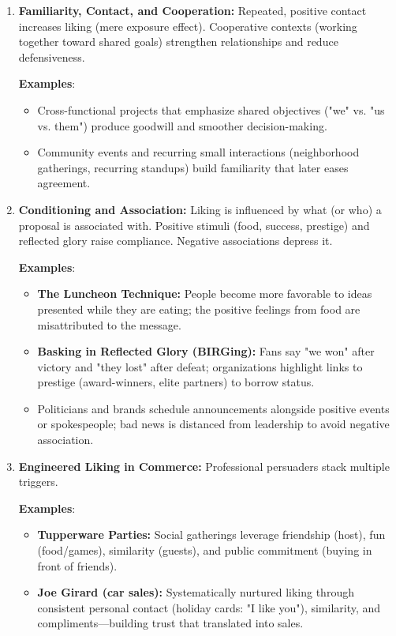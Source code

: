 \begin{enumerate}
    \item \textbf{Familiarity, Contact, and Cooperation:} Repeated, positive contact increases liking (mere exposure effect). Cooperative contexts (working together toward shared goals) strengthen relationships and reduce defensiveness.
    
    \textbf{Examples}:
    \begin{itemize}
        \item Cross-functional projects that emphasize shared objectives ("we" vs. "us vs. them") produce goodwill and smoother decision-making.
        \item Community events and recurring small interactions (neighborhood gatherings, recurring standups) build familiarity that later eases agreement.
    \end{itemize}

    \item \textbf{Conditioning and Association:} Liking is influenced by what (or who) a proposal is associated with. Positive stimuli (food, success, prestige) and reflected glory raise compliance. Negative associations depress it.
    
    \textbf{Examples}:
    \begin{itemize}
        \item \textbf{The Luncheon Technique:} People become more favorable to ideas presented while they are eating; the positive feelings from food are misattributed to the message.
        \item \textbf{Basking in Reflected Glory (BIRGing):} Fans say "we won" after victory and "they lost" after defeat; organizations highlight links to prestige (award-winners, elite partners) to borrow status.
        \item Politicians and brands schedule announcements alongside positive events or spokespeople; bad news is distanced from leadership to avoid negative association.
    \end{itemize}

    \item \textbf{Engineered Liking in Commerce:} Professional persuaders stack multiple triggers.
    
    \textbf{Examples}:
    \begin{itemize}
        \item \textbf{Tupperware Parties:} Social gatherings leverage friendship (host), fun (food/games), similarity (guests), and public commitment (buying in front of friends).
        \item \textbf{Joe Girard (car sales):} Systematically nurtured liking through consistent personal contact (holiday cards: "I like you"), similarity, and compliments—building trust that translated into sales.
    \end{itemize}
\end{enumerate}

